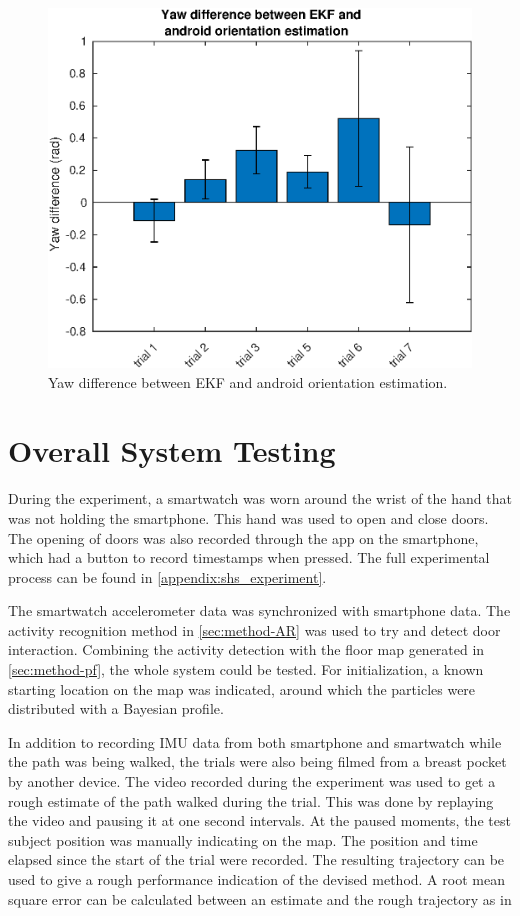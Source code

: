 \begin{figure}[H]
	\centering
	\includegraphics[width=0.7\linewidth]{images/20201118_1616_yaw_difference_between_android_and_EKF_1}
	\setlength{\belowcaptionskip}{-20pt}
	\caption{Yaw difference between EKF and android orientation estimation.}
	\label{fig:yaw_difference_between_android_and_ekf_1}
\end{figure}

\section{Overall System Testing}

During the experiment, a smartwatch was worn around the wrist of the hand that was not holding the smartphone. This hand was used to open and close doors. The opening of doors was also recorded through the app on the smartphone, which had a button to record timestamps when pressed. The full experimental process can be found in \cref{appendix:shs_experiment}. \par

The smartwatch accelerometer data was synchronized with smartphone data. The activity recognition method in \cref{sec:method-AR} was used to try and detect door interaction. Combining the activity detection with the floor map generated in \cref{sec:method-pf}, the whole system could be tested. For initialization, a known starting location on the map was indicated, around which the particles were distributed with a Bayesian profile.  \par 

In addition to recording IMU data from both smartphone and smartwatch while the path was being walked, the trials were also being filmed from a breast pocket by another device. The video recorded during the experiment was used to get a rough estimate of the path walked during the trial. This was done by replaying the video and pausing it at one second intervals. At the paused moments, the test subject position was manually indicating on the map. The position and time elapsed since the start of the trial were recorded. The resulting trajectory can be used to give a rough performance indication of the devised method. A root mean square error can be calculated between an estimate and the rough trajectory as in


